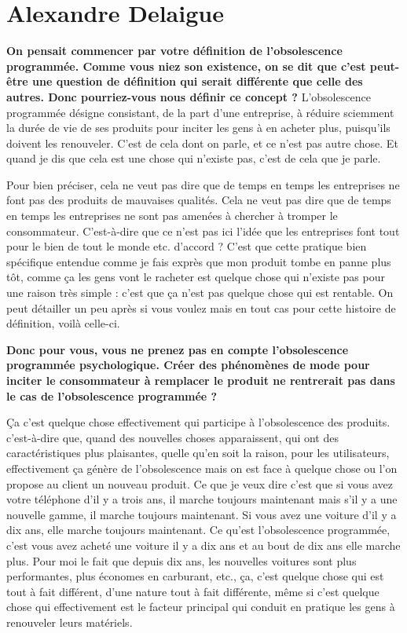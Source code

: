 \section{Alexandre Delaigue}
\label{InterviewADelaigue}

\vspace{2\baselineskip}

\begin{small}
\smallbreak\textbf{On pensait commencer par votre définition de l'obsolescence programmée. Comme vous niez son existence, on se dit que c'est peut-être une question de définition qui serait différente que celle des autres.  Donc pourriez-vous nous définir ce concept ?
}\smallbreak
L'obsolescence programmée désigne consistant, de la part d'une entreprise, à réduire sciemment la durée de vie de ses produits pour inciter les gens à en acheter plus, puisqu'ils doivent les renouveler. C'est de cela dont on parle, et ce n'est pas autre chose. Et quand je dis que cela est une chose qui n'existe pas, c'est de cela que je parle.

Pour bien préciser, cela ne veut pas dire que de temps en temps les entreprises ne font pas des produits de mauvaises qualités. Cela ne veut pas dire que de temps en temps les entreprises ne sont pas amenées à chercher à tromper le consommateur. C'est-à-dire que ce n'est pas ici l'idée que les entreprises font tout pour le bien de tout le monde etc. d'accord ? C'est que cette pratique bien spécifique entendue comme \og je fais exprès que mon produit tombe en panne plus tôt, comme ça les gens vont le racheter \fg{}   est quelque chose qui n'existe pas pour une raison très simple : c'est que ça n'est pas quelque chose qui est rentable. On peut détailler un peu après si vous voulez mais en tout cas pour cette histoire de définition, voilà celle-ci.

\textbf{
Donc pour vous, vous ne prenez pas en compte l'obsolescence programmée psychologique. Créer des phénomènes de mode pour inciter le consommateur à remplacer le produit ne rentrerait pas dans le cas de l'obsolescence programmée ? 
}\smallbreak

Ça c'est quelque chose effectivement qui participe à l'obsolescence des produits. c'est-à-dire que, quand des nouvelles choses apparaissent, qui ont des caractéristiques plus plaisantes, quelle qu'en soit la raison, pour les utilisateurs, effectivement ça génère de l'obsolescence mais on est face à quelque chose ou l'on propose au client un nouveau produit. Ce que je veux dire c'est que si vous avez votre téléphone d'il y a trois ans, il marche toujours maintenant mais s'il y a une nouvelle gamme, il marche toujours maintenant. Si vous avez une voiture d'il y a dix ans, elle marche toujours maintenant. Ce qu'est l'obsolescence programmée, c'est vous avez acheté une voiture il y a dix ans et au bout de dix ans elle marche plus. Pour moi le fait que depuis dix ans, les nouvelles voitures sont plus performantes, plus économes en carburant, etc., ça, c'est quelque chose qui est tout à fait différent, d'une nature tout à fait différente, même si c'est quelque chose qui effectivement est le facteur principal qui conduit en pratique les gens à renouveler leurs matériels.


\end{small}
